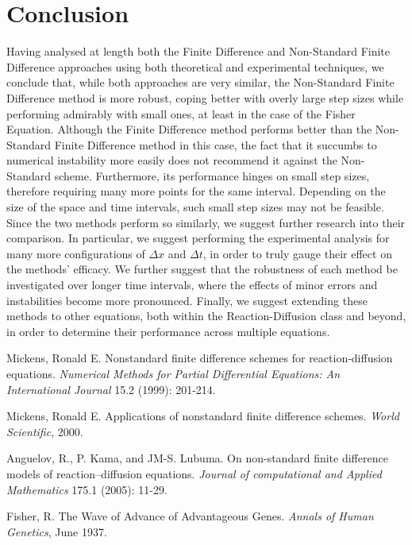 \documentclass[a4paper]{article}
\begin{document}
 \section{Conclusion}\label{sec:conclusion}
    Having analysed at length both the Finite Difference and Non-Standard Finite Difference approaches using both theoretical and experimental techniques, we conclude that, while both approaches are very similar, the Non-Standard Finite Difference method is more robust, coping better with overly large step sizes while performing admirably with small ones, at least in the case of the Fisher Equation. 
    \newline
    Although the Finite Difference method performs better than the Non-Standard Finite Difference method in this case, the fact that it succumbs to numerical instability more easily does not recommend it against the Non-Standard scheme. Furthermore, its performance hinges on small step sizes, therefore requiring many more points for the same interval. Depending on the size of the space and time intervals, such small step sizes may not be feasible.
    \newline
    Since the two methods perform so similarly, we suggest further research into their comparison. In particular, we suggest performing the experimental analysis for many more configurations of $\Delta x$ and $\Delta t$, in order to truly gauge their effect on the methods' efficacy. We further suggest that the robustness of each method be investigated over longer time intervals, where the effects of minor errors and instabilities become more pronounced. Finally, we suggest extending these methods to other equations, both within the Reaction-Diffusion class and beyond, in order to determine their performance across multiple equations.
    
\begin{thebibliography}{9}
    
    Mickens, Ronald E. Nonstandard finite difference schemes for reaction‐diffusion equations. \emph{Numerical Methods for Partial Differential Equations: An International Journal} 15.2 (1999): 201-214.

Mickens, Ronald E. Applications of nonstandard finite difference schemes. \emph{World Scientific}, 2000.


    Anguelov, R., P. Kama, and JM-S. Lubuma. On non-standard finite difference models of reaction–diffusion equations. \emph{Journal of computational and Applied Mathematics} 175.1 (2005): 11-29.

    
    Fisher, R. The Wave of Advance of Advantageous Genes. \emph{Annals of Human Genetics}, June 1937.
\end{thebibliography}
\newpage
\appendix
\appendixpage
\end{document}
